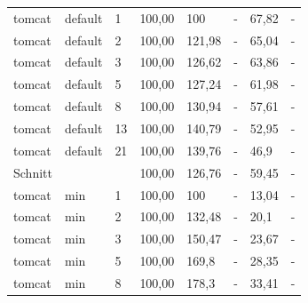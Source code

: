 \begin{footnotesize}
\begin{longtable}{llllllll}
		tomcat         & default & 1          & 100,00 & \cellcolor[HTML]{C0C0C0}100 & -                           & 67,82                       & -                           \\
		tomcat         & default & 2          & 100,00 & 121,98                      & -                           & 65,04                       & -                           \\
		tomcat         & default & 3          & 100,00 & 126,62                      & -                           & 63,86                       & -                           \\
		tomcat         & default & 5          & 100,00 & 127,24                      & -                           & 61,98                       & -                           \\
		tomcat         & default & 8          & 100,00 & 130,94                      & -                           & 57,61                       & -                           \\
		tomcat         & default & 13         & 100,00 & 140,79                      & -                           & 52,95                       & -                           \\
		tomcat         & default & 21         & 100,00 & 139,76                      & -                           & 46,9                        & -                           \\ \hline
		Schnitt        &         &            & 100,00 & 126,76                      & -                           & 59,45                       & -                           \\ \hline
		tomcat         & min     & 1          & 100,00 & \cellcolor[HTML]{C0C0C0}100 & -                           & 13,04                       & -                           \\
		tomcat         & min     & 2          & 100,00 & 132,48                      & -                           & 20,1                        & -                           \\
		tomcat         & min     & 3          & 100,00 & 150,47                      & -                           & 23,67                       & -                           \\
		tomcat         & min     & 5          & 100,00 & 169,8                       & -                           & 28,35                       & -                           \\
		tomcat         & min     & 8          & 100,00 & 178,3                       & -                           & 33,41                       & -                           \\

\end{longtable}
\end{footnotesize}

